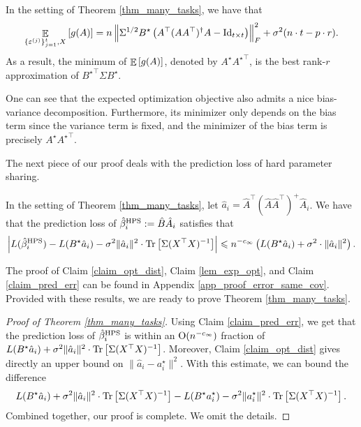 	\begin{claim}\label{lem_exp_opt}
		In the setting of Theorem \ref{thm_many_tasks}, we have that
		\begin{align}
			\mathop{\mathbb{E}}_{\{\varepsilon^{(j)}\}_{j=1}^t, X}\left[ g(A) \right] = n \left\| \Sigma^{1/2} B^{\star} \left({A^{\top} (AA^{\top})^{\dagger} A - \operatorname{Id}_{t\times t}}\right) \right\|_{F}^2 + \sigma^2 (n\cdot t - p \cdot r). \label{eq_gA}
		\end{align}
		As a result, the minimum of $\mathop{\mathbb{E}}\left[ g(A) \right]$, denoted by $A^{\star}{A^\star}^\top$, is the best rank-$r$ approximation of ${B^{\star}}^{\top}\Sigma B^{\star}$.
	\end{claim}

	 One can see that the expected optimization objective also admits a nice bias-variance decomposition.
	Furthermore, its minimizer only depends on the bias term since the variance term is fixed, and the minimizer of the bias term is precisely $A^{\star} {A^{\star}}^{\top}$.

	The next piece of our proof deals with the prediction loss of hard parameter sharing.
	\begin{claim}\label{claim_pred_err}
		In the setting of Theorem \ref{thm_many_tasks},
		let $\hat{a}_i = \hat{A}^{\top} (\hat{A}\hat{A}^{\top})^{+} \hat{A}_i$.
		We have that the prediction loss of $\hat{\beta}_i^{\textup{HPS}} := \hat{B} \hat{A}_i$ satisfies that
		\begin{align*}
			{\left| {L(\hat{\beta}_i^{\textup{HPS}}) - L(B^{\star} \hat{a}_i) - \sigma^2 \|\hat{a}_i\|^2 \cdot \operatorname{Tr}\left[\Sigma (X^{\top}X)^{-1}\right]} \right|}
			\leqslant  n^{-c_\infty} \left( L(B^{\star} \hat{a}_i)+ \sigma^2  \cdot\|\hat a_i\|^2\right) .
		\end{align*}
	\end{claim}
	The proof of Claim \ref{claim_opt_dist}, Claim \ref{lem_exp_opt}, and Claim \ref{claim_pred_err} can be found in Appendix \ref{app_proof_error_same_cov}.
	Provided with these results, we are ready to prove Theorem \ref{thm_many_tasks}.
	\begin{proof}[Proof of Theorem \ref{thm_many_tasks}]
		Using Claim \ref{claim_pred_err}, we get that the prediction loss of $\hat{\beta}_i^{\textup{HPS}}$ is within an $\operatorname{O}(n^{-c_{\infty}})$ fraction of $L(B^{\star}\hat{a}_i)+\sigma^2\|\hat{a}_i\|^2\cdot \operatorname{Tr}\left[\Sigma(X^{\top}X)^{-1}\right]$. Moreover, Claim \ref{claim_opt_dist} gives directly an upper bound on $\|\hat a_i - a_i^\star\|^2$. With this estimate, we can bound the difference 
		$$L(B^{\star}\hat{a}_i)+\sigma^2\|\hat{a}_i\|^2\cdot \operatorname{Tr}\left[\Sigma(X^{\top}X)^{-1}\right] - L(B^{\star} {a}^\star_i)-\sigma^2\|{a}^\star_i\|^2\cdot \operatorname{Tr}\left[\Sigma(X^{\top}X)^{-1}\right].$$
		Combined together, our proof is complete. We omit the details.
	\end{proof}
